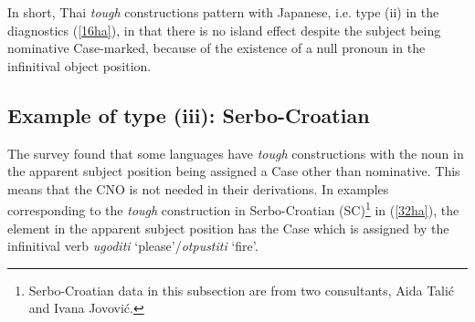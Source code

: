 \documentclass[output=paper]{langscibook}
\begin{document}
\begin{exe}
\ex \label{31ha}
\begin{xlist}

\end{xlist}
\end{exe}

In short, Thai \textit{tough} constructions pattern with Japanese, i.e. type (ii) in the diagnostics (\ref{16ha}), in that there is no island effect despite the subject being nominative Case-marked, because of the existence of a null pronoun in the infinitival object position.  

\subsection{Example of type (iii): Serbo-Croatian} \label{s3.4ha}
The survey found that some languages have \textit{tough} constructions with the noun in the apparent subject position being assigned a Case other than nominative. This means that the CNO is not needed in their derivations. In examples corresponding to the \textit{tough} construction in Serbo-Croatian (SC)\footnote{Serbo-Croatian data in this subsection are from two consultants, Aida Talić and Ivana Jovović.}  in (\ref{32ha}), the element in the apparent subject position has the Case which is assigned by the infinitival verb \textit{ugoditi} ‘please’/\textit{otpustiti} ‘fire’. 
\end{document}
